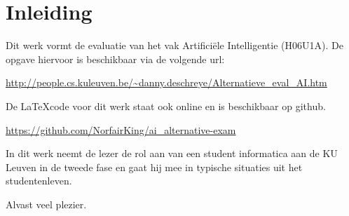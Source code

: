 \documentclass[alternative-exam.tex]{subfiles}
\begin{document}
\chapter*{Inleiding}
Dit werk vormt de evaluatie van het vak Artifici\"ele Intelligentie (H06U1A). De opgave hiervoor is beschikbaar via de volgende url:
\begin{center}
\url{http://people.cs.kuleuven.be/~danny.deschreye/Alternatieve_eval_AI.htm}
\end{center}
\noindent De \LaTeX code voor dit werk staat ook online en is beschikbaar op github.
\begin{center}
\url{https://github.com/NorfairKing/ai_alternative-exam}
\end{center}
In dit werk neemt de lezer de rol aan van een student informatica aan de KU Leuven in de tweede fase en gaat hij mee in typische situaties uit het studentenleven.

\vspace{1cm}
\noindent Alvast veel plezier.
\end{document}
